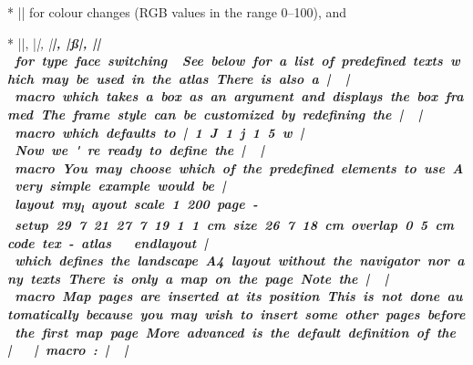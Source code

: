 * |\color[#1 #2 #3]| for colour changes (RGB values in the range 0--100), and

* |\rm|, |\it|, |\bf|, |\ss|, |\si| for type face switching.
\endlist


See below for a list of predefined texts which may be used in the atlas.

There is also a |\framed| macro which takes a box as an argument and displays the
box framed. The frame style can be customized by redefining the |\linestyle|
macro which defaults to |1 J 1 j 1.5 w|.


Now we're ready to define the |\dopage| macro. You may choose which of the
predefined elements to use. A very simple example would be

|layout my_layout
  scale 1 200
  page-setup 29.7 21 27.7 19 1 1 cm
  size 26.7 18 cm
  overlap 0.5 cm
  code tex-atlas
    \def\dopage{\box\mapbox}
    \insertmaps
endlayout|

which defines the landscape A4 layout without the navigator nor any texts. There
is only a map on the page.

Note the |\insertmaps| macro. Map pages are inserted at its position.
This is not done automatically because you may wish to insert some other pages
before the first map page.

More advanced is the default definition of the |\dopage| macro:

|\def\dopage{%
 \vbox{\centerline{\framed{\mapbox}}
  \bigskip
  \line{%
    \vbox to \ht\navbox{
      \hbox{\size[20]\the\pagelabel
        \ifpagenumbering\space(\the\pagenum)\fi
        \space\size[16]\the\pagename}
      \ifpagenumbering
        \medskip
        \hbox{\qquad\qquad
          \vtop{%
            \hbox to 0pt{\hss\showpointer\pointerN\hss}
            \hbox to 0pt{\llap{\showpointer\pointerW\hskip0.7em}%
              \raise1pt\hbox to 0pt{\hss$\updownarrow$\hss}%
              \raise1pt\hbox to 0pt{\hss$\leftrightarrow$\hss}%
              \rlap{\hskip0.7em\showpointer\pointerE}}
              \hbox to 0pt{\hss\showpointer\pointerS\hss}
          }\qquad\qquad
          \vtop{
            \def\arr{$\uparrow$}
            \showpointerlist\pointerU
            \def\arr{$\downarrow$}
            \showpointerlist\pointerD
          }
        }
      \fi
      \vss
      \scalebar
    }\hss
    \box\navbox
  }
 }
}|

